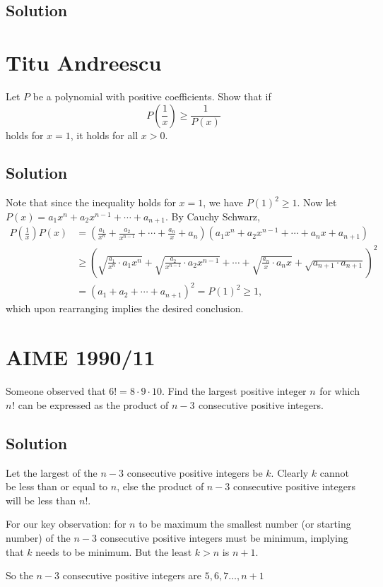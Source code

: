 \documentclass{article}
\begin{document}
\subsection{Solution}


\pagebreak\section{Titu Andreescu}
Let $P$ be a polynomial with positive coefficients. Show that if \[P\left(\frac1x\right)\ge \frac1{P(x)}\] holds for $x=1$, it holds for all $x>0$.
\subsection{Solution}
Note that since the inequality holds for $x=1$, we have $P(1)^2 \geq 1$. Now let $P(x)=a_1x^{n}+a_2x^{n-1}+\cdots+a_{n+1}.$ By Cauchy Schwarz,
\begin{align*}
P\left(\frac1x\right)P(x)&=(\tfrac{a_1}{x^n}+\tfrac{a_2}{x^{n-1}}+\cdots+\tfrac{a_n}{x}+a_n)(a_1x^n+a_2x^{n-1}+\cdots+a_nx+a_{n+1})\\
&\ge (\sqrt{\tfrac{a_1}{x^n}\cdot a_1x^n}+\sqrt{\tfrac{a_2}{x^{n-1}}\cdot a_2x^{n-1}}+\cdots+\sqrt{\tfrac{a_n}{x}\cdot a_nx}+\sqrt{a_{n+1}\cdot a_{n+1}})^2\\
&=(a_1+a_2+\cdots+a_{n+1})^2=P(1)^2\geq 1,
\end{align*}
which upon rearranging implies the desired conclusion.
\pagebreak\section{AIME 1990/11}
Someone observed that $6! = 8 \cdot 9 \cdot 10$. Find the largest positive integer $n^{}_{}$ for which $n^{}_{}!$ can be expressed as the product of $n - 3_{}^{}$ consecutive positive integers.
\subsection{Solution}
Let the largest of the $n-3$ consecutive positive integers be $k$. Clearly $k$ cannot be less than or equal to $n$, else the product of $n-3$ consecutive positive integers will be less than $n!$.

For our key observation: for $n$ to be maximum the smallest number (or starting number) of the $n-3$ consecutive positive integers must be minimum, implying that $k$ needs to be minimum. But the least $k > n$ is $n+1$.

So the $n-3$ consecutive positive integers are $5, 6, 7…, n+1$
\end{document}
